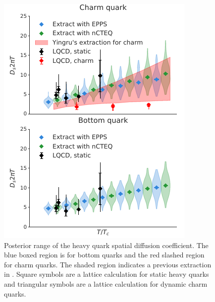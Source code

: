 \documentclass[aps, prc, reprint, amsmath, groupedaddress, nofootinbib]{revtex4-1}
\begin{document}
\begin{figure}
\includegraphics[width=\columnwidth]{Ds_posterior.pdf}
\caption{Posterior range of the heavy quark spatial diffusion coefficient. The blue boxed region is for bottom quarks and the red slashed region for charm quarks. The shaded region indicates a previous extraction in \cite{Xu:2017obm}. Square symbols are a lattice calculation for static heavy quarks and triangular symbols  are a lattice calculation for dynamic charm quarks.}\label{plots:posterior_Ds}
\end{figure}
\end{document}
